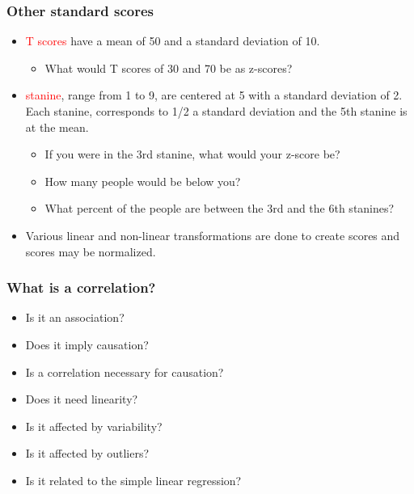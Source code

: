 \documentclass[dvipsnames]{beamer}\usepackage[]{graphicx}\usepackage[]{color}
\begin{document}
\begin{frame}
\frametitle{Other standard scores}
\begin{itemize}
  \item<1-> \textcolor{red}{T scores} have a mean of 50 and a standard deviation of 10.
    \begin{itemize}
      \item<2-> What would T scores of 30 and 70 be as z-scores?
    \end{itemize}
    \item<3-> \textcolor{red}{stanine}, range from 1 to 9, are centered at 5 with a standard deviation of 2. Each stanine, corresponds to 1/2 a standard deviation and the 5th stanine is at the mean.
      \begin{itemize}
        \item<4-> If you were in the 3rd stanine, what would your z-score be?
        \item<5-> How many people would be below you?
        \item<6-> What percent of the people are between the 3rd and the 6th stanines?
      \end{itemize}
      \item<7-> Various linear and non-linear transformations are done to create scores and scores may be normalized.
\end{itemize}
\end{frame}

\begin{frame}
\frametitle{What is a correlation?}
\begin{itemize}
  \item Is it an association?
  \item Does it imply causation?
  \item Is a correlation necessary for causation?
  \item Does it need linearity?
  \item Is it affected by variability?
  \item Is it affected by outliers?
  \item Is it related to the simple linear regression?
\end{itemize}
\end{frame}
\end{document}
